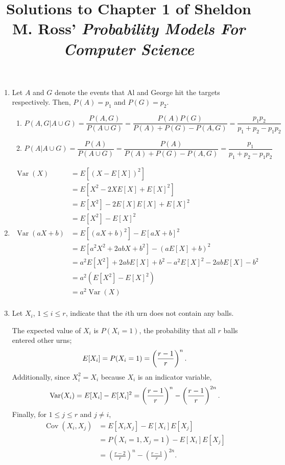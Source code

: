 \documentclass{article}
\title{Solutions to Chapter 1 of Sheldon M. Ross' \textit{Probability Models For Computer Science}}
\date{}
\DeclareMathOperator{\Cov}{Cov}
\DeclareMathOperator{\Var}{Var}
\begin{document}
    \maketitle
\begin{enumerate}
\item
    Let $A$ and $G$ denote the events that Al and George hit the targets respectively. Then, $P(A)=p_1$ and $P(G)=p_2$.
    \begin{enumerate}
    \item
        \[
        P(A,G|A \cup G) = \frac{P(A,G)}{P(A \cup G)} = \frac{P(A)P(G)}{P(A)+P(G)-P(A,G)} = \frac{p_1 p_2}{p_1 + p_2 - p_1 p_2}
        \]
    \item
        \[
        P(A|A \cup G) = \frac{P(A)}{P(A \cup G)} = \frac{P(A)}{P(A)+P(G)-P(A,G)} = \frac{p_1}{p_1 + p_2 - p_1 p_2}
        \]
    \end{enumerate}
\item
    \[\begin{split}
    \Var(X) & = E[ (X-E[X])^2 ] \\
            & = E[ X^2 - 2XE[X] + E[X]^2 ] \\
            & = E[ X^2 ] - 2E[X]E[X] + E[X]^2 \\
            & = E[ X^2 ] - E[X]^2 \\
    \Var(aX + b)    & = E[ (aX+b)^2 ] - E[ aX+b ]^2 \\
                    & = E[ a^2X^2 + 2abX + b^2 ] - (aE[X] + b)^2 \\
                    & = a^2E[X^2] + 2abE[X] + b^2 - a^2E[X]^2 - 2abE[X] - b^2 \\
                    & = a^2(E[X^2] - E[X]^2) \\
                    & = a^2 \Var(X) \\
    \end{split}\]
\item
    Let $X_i$, $1 \leq i \leq r$, indicate that the $i$th urn does not contain any balls.

    The expected value of $X_i$ is $P(X_i=1)$, the probability that all $r$ balls entered other urns;
    \[
    E[X_i] = P(X_i = 1) = \left(\frac{r-1}{r}\right)^n\text.
    \]
    Additionally, since $X_i^2=X_i$ because $X_i$ is an indicator variable,
    \[
    \Var(X_i) = E[X_i] - E[X_i]^2 = \left(\frac{r-1}{r}\right)^n - \left(\frac{r-1}{r}\right)^{2n}\text.
    \]
    Finally, for $1 \leq j \leq r$ and $j \neq i$,
    \begin{equation*}\begin{split}
    \Cov(X_i, X_j) & = E[X_i X_j] - E[X_i]E[X_j] \\
                   & = P(X_i=1, X_j=1) - E[X_i]E[X_j] \\
                   & = \left(\frac{r-2}{r}\right)^n - \left(\frac{r-1}{r}\right)^{2n}.
    \end{split}\end{equation*}


\end{enumerate}
\end{document}
